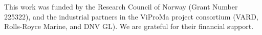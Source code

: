\documentclass[prb,aps,showpacs,floatfix,twocolumn,10pt]{revtex4-1}
\theoremstyle{plain}
\theoremstyle{remark}
\begin{document}



\begin{acknowledgements}

This work was funded by the Research Council of Norway (Grant Number 225322), and the industrial partners in the ViProMa project consortium (VARD, Rolls-Royce Marine, and DNV GL).
We are grateful for their financial support.

\end{acknowledgements}




\nocite{*}    



\end{document}
